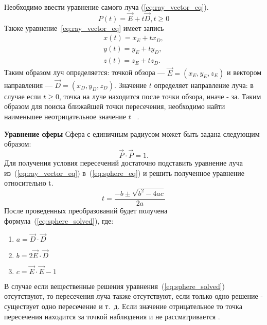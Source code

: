Необходимо ввести уравнение самого луча (\ref{eq:ray_vector_eq}).
\begin{equation} 
	P(t) = \vec{E} +t\vec{D},t \ge 0
	\label{eq:ray_vector_eq}
\end{equation}
Также уравнение~\ref{eq:ray_vector_eq} имеет запись
\begin{equation}
	\label{eq:ray_scalar_eq}
	\begin{aligned}
		x(t) = x_E + t x_D, \\
		y(t) = y_E + t y_D, \\
		z(t) = z_E + t z_D.
	\end{aligned}
\end{equation}
Таким образом луч определяется: точкой обзора --- $\vec{E} = (x_E,y_E,z_E)$ и вектором направления --- $\vec{D} = (x_D,y_D,z_D)$. Значение $t$  определяет направление луча: в случае если $t \ge 0$,
точка на луче находится после точки обзора, иначе - за. Таким образом для поиска ближайшей точки пересечения, необходимо найти наименьшее неотрицательное значение $t$~\cite{Rodgers,primitives_raytracing_equations} .


\textbf{Уравнение сферы}
Сфера с единичным радиусом может быть задана следующим образом:
\begin{equation}
	\vec{P} \cdot \vec{P}=1.
	\label{eq:sphere_eq}
\end{equation}
Для получения условия пересечений достаточно подставить уравнение луча из~(\ref{eq:ray_vector_eq}) в~(\ref{eq:sphere_eq}) и решить полученное уравнение относительно t.
\begin{equation}
	t=\frac{-b\pm\sqrt{b^2-4ac}}{2a}
	\label{eq:sphere_solved}
\end{equation}
После проведенных преобразований будет получена формула~(\ref{eq:sphere_solved}), где:
\begin{enumerate}
	\item $a = \vec{D} \cdot \vec{D}$ 
	\item $b = 2\vec{E} \cdot \vec{D}$ 
	\item $c = \vec{E} \cdot \vec{E} - 1$
\end{enumerate}
В случае если вещественные решения уравнения~(\ref{eq:sphere_solved}) отсутствуют, то пересечения луча также отсутствуют, если только одно решение  - существует одно
пересечение и т.~д. Если значение отрицательное то точка пересечения находится за точкой наблюдения и не рассматривается \cite{primitives_raytracing_equations}.

